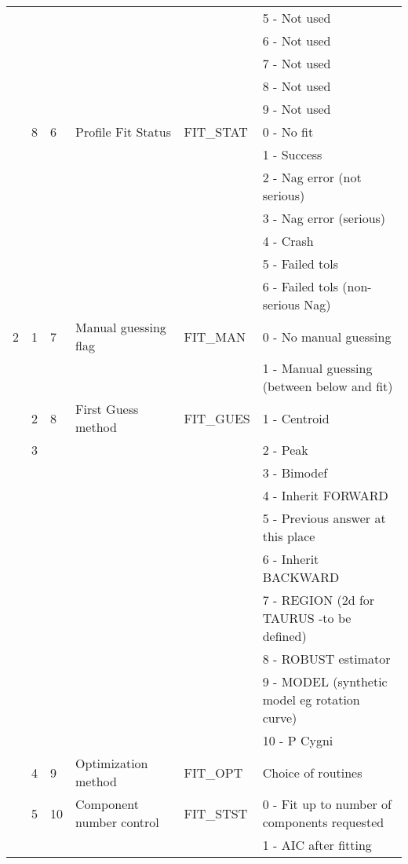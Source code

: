 \begin{latexonly}
\begin{table}
\begin{center}
\begin{tabular}{|l|l|l|l|l|l|}
  &   &   & & & 5 - Not used \\
  &   &   & & & 6 - Not used\\
  &   &   & & & 7 - Not used\\
  &   &   & & & 8 - Not used\\
  &   &   & & & 9 - Not used\\ \cline{2-6}
  & 8 & 6 & Profile Fit Status & FIT\_STAT & 0 - No fit \\
  &   &   &                    & & 1 - Success \\
  &   &   &                    & & 2 - Nag error (not serious)\\
  &   &   &                    & & 3 - Nag error (serious)\\
  &   &   &                    & & 4 - Crash \\
  &   &   &                    & & 5 - Failed tols\\
  &   &   &                & & 6 - Failed tols (non-serious Nag)\\ \hline
2 & 1 & 7 & Manual guessing flag & FIT\_MAN & 0 - No manual guessing\\
  &   &   & & &  1 - Manual guessing (between below and fit)\\ \cline{2-6}
  & 2 & 8 & First Guess method & FIT\_GUES & 1 - Centroid \\
  & 3 &   &                    & &  2 - Peak\\
  &   &   &                    & &  3 - Bimodef\\
  &   &   &                    & &  4 - Inherit FORWARD\\
  &   &   &                    & &  5 - Previous answer at this place\\
  &   &   &                    & &  6 - Inherit BACKWARD\\
  &   &   &              & &  7 - REGION (2d for TAURUS -to be defined)\\
  &   &   &                    & &  8 - ROBUST estimator\\
  &   &   &                    & &  9 - MODEL (synthetic model eg
rotation curve)\\
  &   &   &                    & &  10 - P Cygni\\ \cline{2-6}
  & 4 & 9 & Optimization method & FIT\_OPT & Choice of routines\\ \cline{2-6}
  & 5 & 10 & Component number control & FIT\_STST &
                       0 - Fit up to number of components requested\\
  &   &   &  & &         1 - AIC after fitting\\

\end{tabular}
\end{center}
\end{table}
\end{latexonly}
